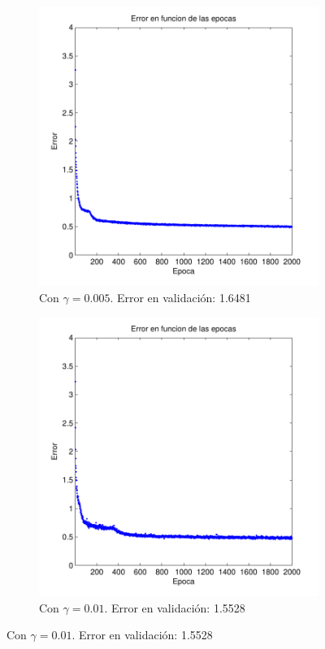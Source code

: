\documentclass[informe.tex]{subfiles}
\begin{document}
    \begin{figure}[H]
        \centering
        \begin{subfigure}[b]{0.49\textwidth}
                \includegraphics[width=\textwidth]{graficos/error_fold2_20_binary-regresion_2000_0005.pdf}
                \caption{Con $\gamma=0.005$. Error en validación: 1.6481}
                \label{fig:d2-f2-2k-0005-n20}
        \end{subfigure}
        \begin{subfigure}[b]{0.49\textwidth}
                \includegraphics[width=\textwidth]{graficos/error_fold2_20_binary-regresion_2000_001.pdf}
                \caption{Con $\gamma=0.01$. Error en validación: 1.5528}
                \label{fig:d2-f2-2k-001-n20}
        \end{subfigure}
        

\end{figure}
\end{document}
